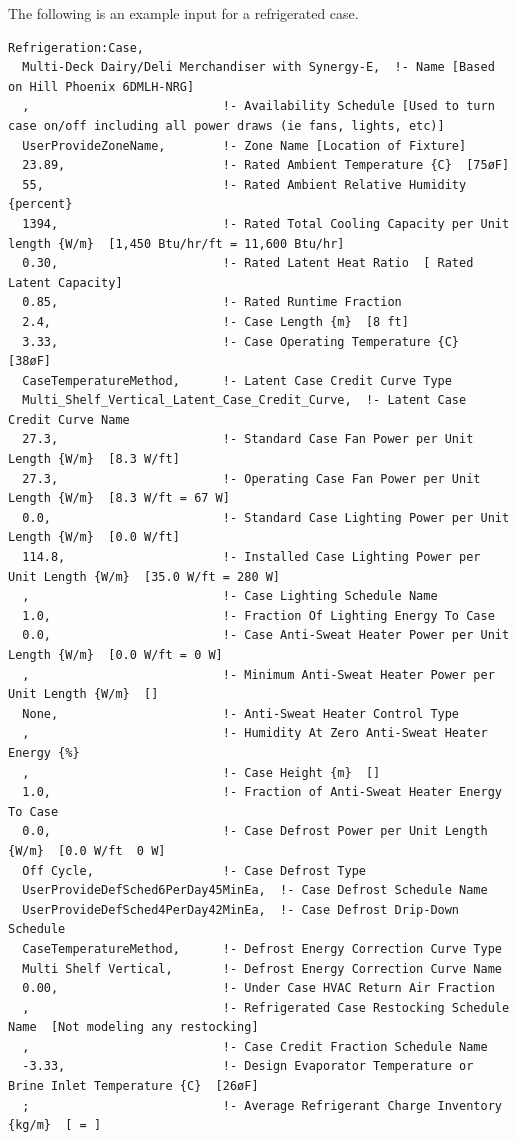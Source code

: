 The following is an example input for a refrigerated case.

\begin{lstlisting}
Refrigeration:Case,
  Multi-Deck Dairy/Deli Merchandiser with Synergy-E,  !- Name [Based on Hill Phoenix 6DMLH-NRG]
  ,                           !- Availability Schedule [Used to turn case on/off including all power draws (ie fans, lights, etc)]
  UserProvideZoneName,        !- Zone Name [Location of Fixture]
  23.89,                      !- Rated Ambient Temperature {C}  [75øF]
  55,                         !- Rated Ambient Relative Humidity {percent}
  1394,                       !- Rated Total Cooling Capacity per Unit length {W/m}  [1,450 Btu/hr/ft = 11,600 Btu/hr]
  0.30,                       !- Rated Latent Heat Ratio  [ Rated Latent Capacity]
  0.85,                       !- Rated Runtime Fraction
  2.4,                        !- Case Length {m}  [8 ft]
  3.33,                       !- Case Operating Temperature {C}  [38øF]
  CaseTemperatureMethod,      !- Latent Case Credit Curve Type
  Multi_Shelf_Vertical_Latent_Case_Credit_Curve,  !- Latent Case Credit Curve Name
  27.3,                       !- Standard Case Fan Power per Unit Length {W/m}  [8.3 W/ft]
  27.3,                       !- Operating Case Fan Power per Unit Length {W/m}  [8.3 W/ft = 67 W]
  0.0,                        !- Standard Case Lighting Power per Unit Length {W/m}  [0.0 W/ft]
  114.8,                      !- Installed Case Lighting Power per Unit Length {W/m}  [35.0 W/ft = 280 W]
  ,                           !- Case Lighting Schedule Name
  1.0,                        !- Fraction Of Lighting Energy To Case
  0.0,                        !- Case Anti-Sweat Heater Power per Unit Length {W/m}  [0.0 W/ft = 0 W]
  ,                           !- Minimum Anti-Sweat Heater Power per Unit Length {W/m}  []
  None,                       !- Anti-Sweat Heater Control Type
  ,                           !- Humidity At Zero Anti-Sweat Heater Energy {%}
  ,                           !- Case Height {m}  []
  1.0,                        !- Fraction of Anti-Sweat Heater Energy To Case
  0.0,                        !- Case Defrost Power per Unit Length {W/m}  [0.0 W/ft  0 W]
  Off Cycle,                  !- Case Defrost Type
  UserProvideDefSched6PerDay45MinEa,  !- Case Defrost Schedule Name
  UserProvideDefSched4PerDay42MinEa,  !- Case Defrost Drip-Down Schedule
  CaseTemperatureMethod,      !- Defrost Energy Correction Curve Type
  Multi Shelf Vertical,       !- Defrost Energy Correction Curve Name
  0.00,                       !- Under Case HVAC Return Air Fraction
  ,                           !- Refrigerated Case Restocking Schedule Name  [Not modeling any restocking]
  ,                           !- Case Credit Fraction Schedule Name
  -3.33,                      !- Design Evaporator Temperature or Brine Inlet Temperature {C}  [26øF]
  ;                           !- Average Refrigerant Charge Inventory {kg/m}  [ = ]
\end{lstlisting}

